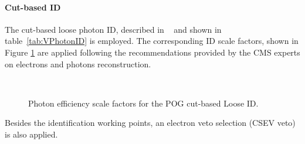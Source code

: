 \paragraph{Cut-based ID}
The cut-based loose photon ID, described in ~\cite{CMS:EGM-17-001} and shown in table~\ref{tab:VPhotonID} is employed.
The corresponding ID scale factors, shown in Figure \ref{fig:phEffSF} are applied following the recommendations provided by the CMS experts on electrons and photons reconstruction.

\begin{figure}
\\
\caption{Photon efficiency scale factors for the POG cut-based Loose ID.}
\label{fig:phEffSF}
\end{figure}

Besides the identification working points, an electron veto selection (CSEV veto) is also applied.


